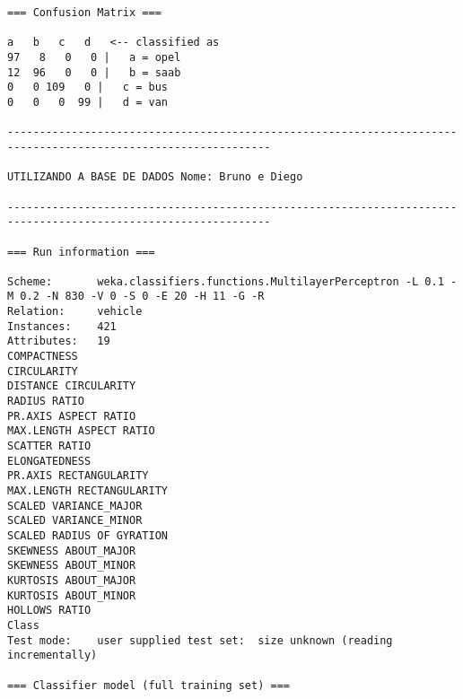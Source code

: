 \documentclass[
	article,			%
	11pt,				%
	oneside,			%
	a4paper,			%
	english,			%
	brazil,				%
	sumario=tradicional
	]{abntex2}
\begin{document}
\begin{lstlisting}
=== Confusion Matrix ===

a   b   c   d   <-- classified as
97   8   0   0 |   a = opel
12  96   0   0 |   b = saab
0   0 109   0 |   c = bus
0   0   0  99 |   d = van

---------------------------------------------------------------------------------------------------------------

UTILIZANDO A BASE DE DADOS Nome: Bruno e Diego

---------------------------------------------------------------------------------------------------------------

=== Run information ===

Scheme:       weka.classifiers.functions.MultilayerPerceptron -L 0.1 -M 0.2 -N 830 -V 0 -S 0 -E 20 -H 11 -G -R
Relation:     vehicle
Instances:    421
Attributes:   19
COMPACTNESS
CIRCULARITY
DISTANCE CIRCULARITY
RADIUS RATIO
PR.AXIS ASPECT RATIO
MAX.LENGTH ASPECT RATIO
SCATTER RATIO
ELONGATEDNESS
PR.AXIS RECTANGULARITY
MAX.LENGTH RECTANGULARITY
SCALED VARIANCE_MAJOR
SCALED VARIANCE_MINOR
SCALED RADIUS OF GYRATION
SKEWNESS ABOUT_MAJOR
SKEWNESS ABOUT_MINOR
KURTOSIS ABOUT_MAJOR
KURTOSIS ABOUT_MINOR
HOLLOWS RATIO
Class
Test mode:    user supplied test set:  size unknown (reading incrementally)

=== Classifier model (full training set) ===


\end{lstlisting}
\end{document}
